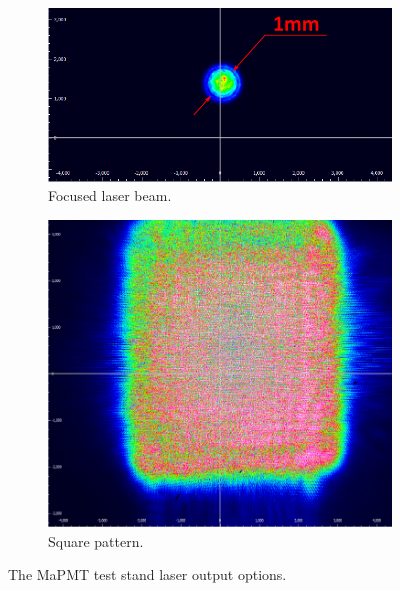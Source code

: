 \documentclass[5p,times,twocolumn]{elsarticle}
\begin{document}
\begin{figure}[bt]
	\centering
	\begin{subfigure}[b]{0.628\linewidth}
		\includegraphics[width=\textwidth]{beamspot.pdf}
		\caption{Focused laser beam.}
		\label{fig:beamopt1}
	\end{subfigure}
	\begin{subfigure}[b]{0.354\linewidth}
		\includegraphics[width=\textwidth]{beamsquare.pdf}
		\caption{Square pattern.}
		\label{fig:beamopt2}
	\end{subfigure}
	\caption{The MaPMT test stand laser output options.}
\end{figure}
\end{document}
